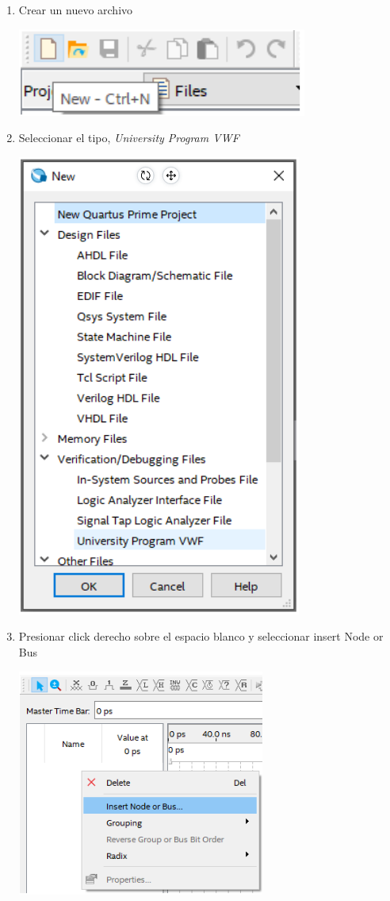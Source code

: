 \documentclass{IEEEtran}
\begin{document}
\begin{enumerate}
\begin{center}
\end{center}
\item Crear un nuevo archivo
\begin{center}
\includegraphics[width=0.6\linewidth]{./img/new1.png}
\end{center}
\item Seleccionar el tipo, \emph{University Program VWF}
\begin{center}
\includegraphics[width=0.6\linewidth]{./img/new2.png}
\end{center}
\item Presionar click derecho sobre el espacio blanco y seleccionar insert Node or Bus
\begin{center}
\includegraphics[width=0.6\linewidth]{./img/sim1.png}

\end{center}
\end{enumerate}
\end{document}
